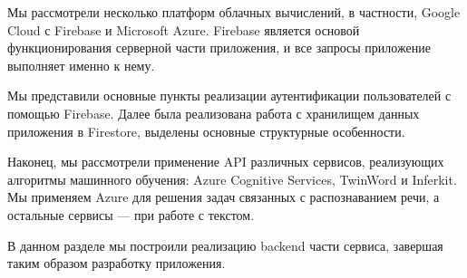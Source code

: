 Мы рассмотрели несколько платформ облачных вычислений, в частности, Google Cloud с Firebase и Microsoft Azure. Firebase является основой функционирования серверной части приложения, и все запросы приложение выполняет именно к нему.

Мы представили основные пункты реализации аутентификации пользователей с помощью Firebase. Далее была реализована работа с хранилищем данных приложения в Firestore, выделены основные структурные особенности.

Наконец, мы рассмотрели применение API различных сервисов, реализующих алгоритмы машинного обучения: Azure Cognitive Services, TwinWord и Inferkit. Мы применяем Azure для решения задач связанных с распознаванием речи, а остальные сервисы --- при работе с текстом.

В данном разделе мы построили реализацию backend части сервиса, завершая таким образом разработку приложения.
